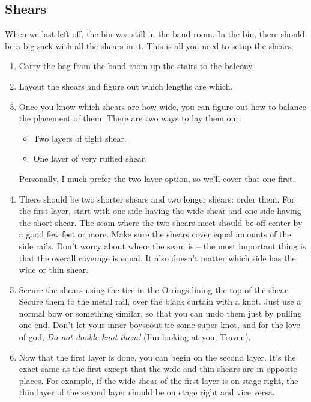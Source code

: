 \documentclass[letterpaper,10pt,oneside,headsepline]{scrreprt}
\begin{document}
\subsection{Shears}
When we last left off, the bin was still in the band room. In the bin, there should be a big sack with all the shears in it. This is all you need to setup the shears.
\begin{enumerate}
\item Carry the bag from the band room up the stairs to the balcony.
\item Layout the shears and figure out which lengths are which.
\item Once you know which shears are how wide, you can figure out how to balance the placement of them. There are two ways to lay them out: 
\begin{itemize}
\item Two layers of tight shear.
\item One layer of very ruffled shear. 
\end{itemize}

Personally, I much prefer the two layer option, so we'll cover that one first. 

\item There should be two shorter shears and two longer shears: order them. For the first layer, start with one side having the wide shear and one side having the short shear. The seam where the two shears meet should be off center by a good few feet or more. Make sure the shears cover equal amounts of the side rails. Don't worry about where the seam is --  the most important thing is that the overall coverage is equal. It also doesn't matter which side has the wide or thin shear.
\item Secure the shears using the ties in the O-rings lining the top of the shear. Secure them to the metal rail, over the black curtain with a knot. Just use a normal bow or something similar, so that you can undo them just by pulling one end. Don't let your inner boyscout tie some super knot, and for the love of god, \textit{Do not double knot them!} (I'm looking at you, Traven).
\item Now that the first layer is done, you can begin on the second layer. It's the exact same as the first except that the wide and thin shears are in opposite places. For example, if the wide shear of the first layer is on stage right, the thin layer of the second layer should be on stage right and vice versa.  
\end{enumerate}
\end{document}
